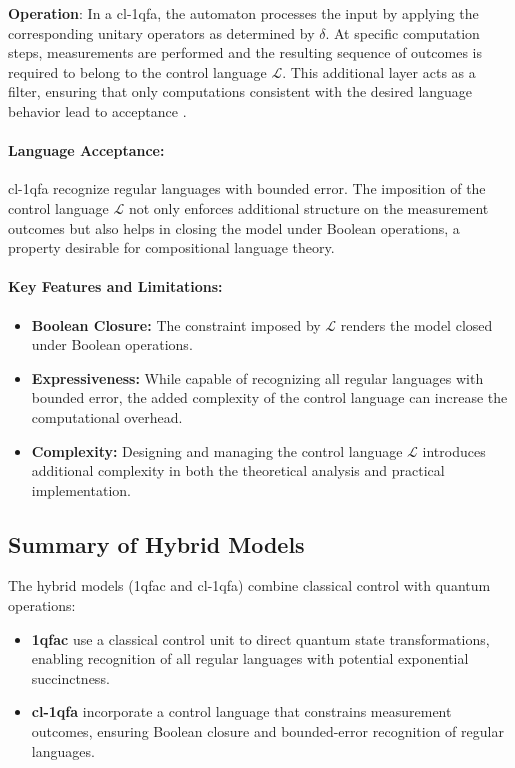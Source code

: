 \textbf{Operation}:  
In a \gls{cl-1qfa}, the automaton processes the input by applying the corresponding unitary operators as determined by \(\delta\). At specific computation steps, measurements are performed and the resulting sequence of outcomes is required to belong to the control language \( \mathcal{L} \). This additional layer acts as a filter, ensuring that only computations consistent with the desired language behavior lead to acceptance \cite{bertoni2003quantum}.

\paragraph{Language Acceptance:}  
\gls{cl-1qfa} recognize regular languages with bounded error. The imposition of the control language \( \mathcal{L} \) not only enforces additional structure on the measurement outcomes but also helps in closing the model under Boolean operations, a property desirable for compositional language theory.

\paragraph{Key Features and Limitations:}
\begin{itemize}
    \item \textbf{Boolean Closure:} The constraint imposed by \( \mathcal{L} \) renders the model closed under Boolean operations.
    \item \textbf{Expressiveness:} While capable of recognizing all regular languages with bounded error, the added complexity of the control language can increase the computational overhead.
    \item \textbf{Complexity:} Designing and managing the control language \( \mathcal{L} \) introduces additional complexity in both the theoretical analysis and practical implementation.
\end{itemize}

\subsection*{Summary of Hybrid Models}
The hybrid models (\gls{1qfac} and \gls{cl-1qfa}) combine classical control with quantum operations:
\begin{itemize}
    \item \textbf{\gls{1qfac}} use a classical control unit to direct quantum state transformations, enabling recognition of all regular languages with potential exponential succinctness.
    \item \textbf{\gls{cl-1qfa}} incorporate a control language that constrains measurement outcomes, ensuring Boolean closure and bounded-error recognition of regular languages.
\end{itemize}

